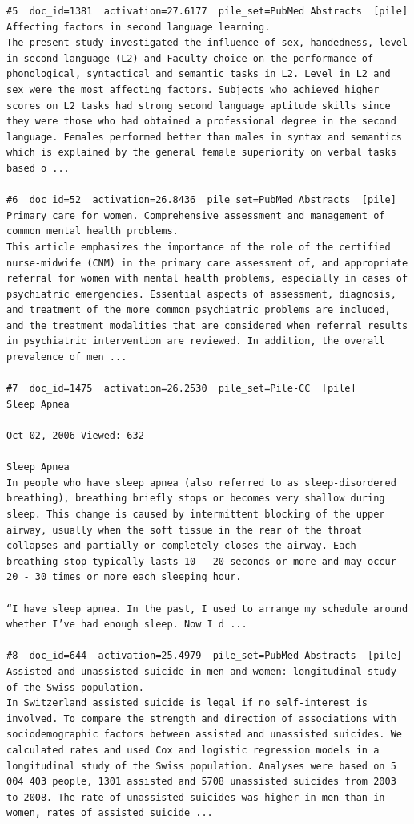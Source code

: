 \begin{verbatim}
#5  doc_id=1381  activation=27.6177  pile_set=PubMed Abstracts  [pile]
Affecting factors in second language learning.
The present study investigated the influence of sex, handedness, level in second language (L2) and Faculty choice on the performance of phonological, syntactical and semantic tasks in L2. Level in L2 and sex were the most affecting factors. Subjects who achieved higher scores on L2 tasks had strong second language aptitude skills since they were those who had obtained a professional degree in the second language. Females performed better than males in syntax and semantics which is explained by the general female superiority on verbal tasks based o ...

#6  doc_id=52  activation=26.8436  pile_set=PubMed Abstracts  [pile]
Primary care for women. Comprehensive assessment and management of common mental health problems.
This article emphasizes the importance of the role of the certified nurse-midwife (CNM) in the primary care assessment of, and appropriate referral for women with mental health problems, especially in cases of psychiatric emergencies. Essential aspects of assessment, diagnosis, and treatment of the more common psychiatric problems are included, and the treatment modalities that are considered when referral results in psychiatric intervention are reviewed. In addition, the overall prevalence of men ...

#7  doc_id=1475  activation=26.2530  pile_set=Pile-CC  [pile]
Sleep Apnea

Oct 02, 2006 Viewed: 632

Sleep Apnea
In people who have sleep apnea (also referred to as sleep-disordered breathing), breathing briefly stops or becomes very shallow during sleep. This change is caused by intermittent blocking of the upper airway, usually when the soft tissue in the rear of the throat collapses and partially or completely closes the airway. Each breathing stop typically lasts 10 - 20 seconds or more and may occur 20 - 30 times or more each sleeping hour.

“I have sleep apnea. In the past, I used to arrange my schedule around whether I’ve had enough sleep. Now I d ...

#8  doc_id=644  activation=25.4979  pile_set=PubMed Abstracts  [pile]
Assisted and unassisted suicide in men and women: longitudinal study of the Swiss population.
In Switzerland assisted suicide is legal if no self-interest is involved. To compare the strength and direction of associations with sociodemographic factors between assisted and unassisted suicides. We calculated rates and used Cox and logistic regression models in a longitudinal study of the Swiss population. Analyses were based on 5 004 403 people, 1301 assisted and 5708 unassisted suicides from 2003 to 2008. The rate of unassisted suicides was higher in men than in women, rates of assisted suicide ...


\end{verbatim}
